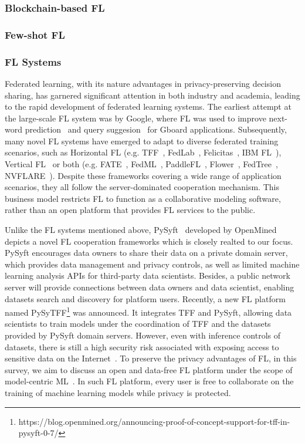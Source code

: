 \subsubsection{Blockchain-based FL}

\subsubsection{Few-shot FL}

\subsubsection{FL Systems}
Federated learning, with its nature advantages in privacy-preserving decision sharing, has garnered significant attention in both industry and academia, leading to the rapid development of federated learning systems.
The earliest attempt at the large-scale FL system was by Google, where FL was used to improve next-word prediction~\cite{hard2018federated} and query suggesion~\cite{yang2018applied} for Gboard applications.
Subsequently, many novel FL systems have emerged to adapt to diverse federated training scenarios, such as Horizontal FL (e.g. TFF~\cite{abadi2016tensorflow}, FedLab~\cite{zeng2021fedlab}, Felicitas~\cite{zhang2022felicitas}, IBM FL~\cite{ibmfl2020ibm}), Vertical FL~\cite{wu2022practical} or both (e.g. FATE~\cite{liu2021fate}, FedML~\cite{he2020fedml}, PaddleFL~\cite{ma2019paddlepaddle}, Flower~\cite{beutel2020flower}, FedTree~\cite{li2022fedtree}, NVFLARE~\cite{roth2022nvidia}).
Despite these frameworks covering a wide range of application scenarios, they all follow the server-dominated cooperation mechanism.
This business model restricts FL to function as a collaborative modeling software, rather than an open platform that provides FL services to the public.

Unlike the FL systems mentioned above, PySyft~\cite{ziller2021pysyft} developed by OpenMined depicts a novel FL cooperation frameworks which is closely realted to our focus. 
PySyft encourages data owners to share their data on a private domain server, which provides data management and privacy controls, as well as limited machine learning analysis APIs for third-party data scientists.
Besides, a public network server will provide connections between data owners and data scientist, enabling datasets search and discovery for platform users.
Recently, a new FL platform named PySyTFF\footnote{https://blog.openmined.org/announcing-proof-of-concept-support-for-tff-in-pysyft-0-7/} was announced. It integrates TFF and PySyft, allowing data scientists to train models under the coordination of TFF and the datasets provided by PySyft domain servers.
However, even with inference controls of datasets, there is still a high security risk associated with exposing access to sensitive data on the Internet~\cite{gamundani2018review}.
To preserve the privacy advantages of FL, in this survey, we aim to discuss an open and data-free FL platform under the scope of model-centric ML~\cite{lou2020towards}.
In such FL platform, every user is free to collaborate on the training of machine learning models while privacy is protected.

